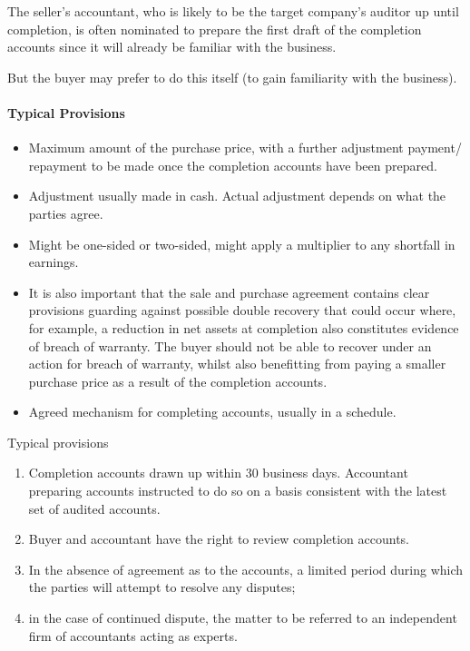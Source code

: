 \documentclass[
]{article}
\providecommand{\tightlist}{%
  \setlength{\itemsep}{0pt}\setlength{\parskip}{0pt}}
\newenvironment{env-c5a21b51-dc78-4e82-bd56-c0130c2151f9}
{
    \savenotes\tcolorbox[blanker,breakable,left=5pt,borderline west={2pt}{-4pt}{purple}]
}
{
    \endtcolorbox\spewnotes
}
\begin{document}
The seller's accountant, who is likely to be the target company's
auditor up until completion, is often nominated to prepare the first
draft of the completion accounts since it will already be familiar with
the business.

But the buyer may prefer to do this itself (to gain familiarity with the
business).

\hypertarget{typical-provisions}{%
\paragraph{Typical Provisions}\label{typical-provisions}}

\begin{itemize}
\tightlist
\item
  Maximum amount of the purchase price, with a further adjustment
  payment/ repayment to be made once the completion accounts have been
  prepared.
\item
  Adjustment usually made in cash. Actual adjustment depends on what the
  parties agree.
\item
  Might be one-sided or two-sided, might apply a multiplier to any
  shortfall in earnings.
\item
  It is also important that the sale and purchase agreement contains
  clear provisions guarding against possible double recovery that could
  occur where, for example, a reduction in net assets at completion also
  constitutes evidence of breach of warranty. The buyer should not be
  able to recover under an action for breach of warranty, whilst also
  benefitting from paying a smaller purchase price as a result of the
  completion accounts.
\item
  Agreed mechanism for completing accounts, usually in a schedule.
\end{itemize}

\begin{env-c5a21b51-dc78-4e82-bd56-c0130c2151f9}

Typical provisions

\begin{enumerate}
\tightlist
\item
  Completion accounts drawn up within 30 business days. Accountant
  preparing accounts instructed to do so on a basis consistent with the
  latest set of audited accounts.
\item
  Buyer and accountant have the right to review completion accounts.
\item
  In the absence of agreement as to the accounts, a limited period
  during which the parties will attempt to resolve any disputes;
\item
  in the case of continued dispute, the matter to be referred to an
  independent firm of accountants acting as experts.
\end{enumerate}

\end{env-c5a21b51-dc78-4e82-bd56-c0130c2151f9}
\end{document}

